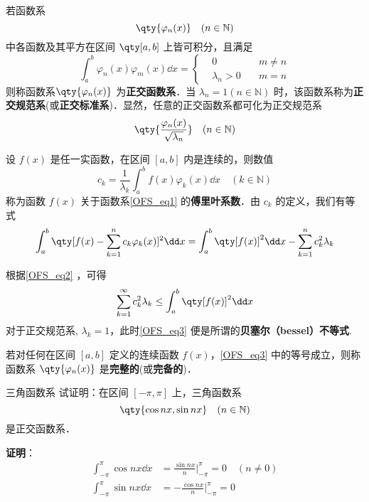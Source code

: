 
\begin{issues}
\issueDraft
\end{issues}

若函数系 
\begin{equation}\label{OFS_eq1}
\qty{\varphi_n(x)}\quad(n\in \mathbb{N})
\end{equation}
中各函数及其平方在区间 $\qty[a,b]$ 上皆可积分，且满足
\begin{equation}
\int_a^b\varphi_n(x)\varphi_m(x)\dd x=
\left\{
    \begin{aligned}
    &0\quad &m\neq n\\
   &\lambda_n>0\quad &m=n
    \end{aligned}
\right.
\end{equation}
则称函数系$\qty{\varphi_n(x)}$ 为\textbf{正交函数系}．当 $\lambda_n=1(n\in\mathbb{N})$ 时，该函数系称为\textbf{正交规范系}(或\textbf{正交标准系})．显然，任意的正交函数系都可化为正交规范系 
\begin{equation}
\qty{\frac{\varphi_n(x)}{\sqrt{\lambda_n}}}\quad(n\in \mathbb{N})
\end{equation}

设 $f(x)$ 是任一实函数，在区间 $[a,b]$ 内是连续的，则数值
\begin{equation}
c_k=\frac{1}{\lambda_k}\int_a^b f(x)\varphi_k(x)\dd x\quad (k\in \mathbb{N})
\end{equation}
称为函数 $f(x)$ 关于函数系\autoref{OFS_eq1} 的\textbf{傅里叶系数}．由 $c_k$ 的定义，我们有等式
\begin{equation}\label{OFS_eq2}
\int_a^b\qty[f(x)-\sum_{k=1}^nc_k\varphi_k(x)]^2\dd x=\int_a^b\qty[f(x)]^2\dd x-\sum_{k=1}^nc_k^2\lambda_k
\end{equation}

根据\autoref{OFS_eq2} ，可得
\begin{equation}\label{OFS_eq3}
\sum_{k=1}^\infty c_k^2\lambda_k\leq\int_a^b\qty[f(x)]^2\dd x
\end{equation}
对于正交规范系, $\lambda_k=1$，此时\autoref{OFS_eq3} 便是所谓的\textbf{贝塞尔（bessel）不等式}. 

若对任何在区间 $[a,b]$ 定义的连续函数 $f(x)$，\autoref{OFS_eq3} 中的等号成立，则称函数系 $\qty{\varphi_n(x)}$ 是\textbf{完整的}(或\textbf{完备的})．
\begin{example}{三角函数系}
试证明：在区间 $[-\pi,\pi]$ 上，三角函数系
\begin{equation}
\qty{\cos nx,\sin nx}\quad(n\in \mathbb{N})
\end{equation}
是正交函数系．

\textbf{证明}：
\begin{equation}
\begin{aligned}
\int_{-\pi}^{\pi}\cos nx\dd x&=\frac{\sin nx}{n}\bigg\vert_{-\pi}^{\pi}=0\quad (n\neq 0)\\
\int_{-\pi}^{\pi}\sin nx\dd x&=-\frac{\cos nx}{n}\bigg\vert_{-\pi}^{\pi}=0
\end{aligned}
\end{equation}

\end{example}


